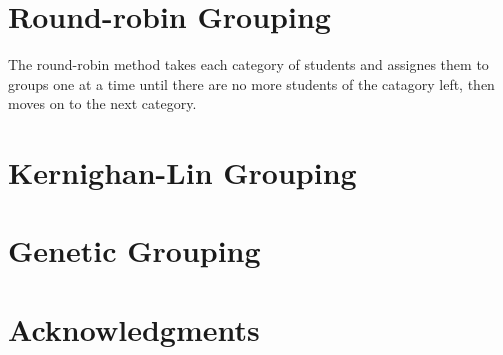\documentclass[a0paper,fleqn]{betterposter}
\begin{document}
{\section{Round-robin Grouping}
The round-robin method takes each category of students and assignes them to
groups one at a time until there are no more students of the catagory left, then
moves on to the next category.

\section{Kernighan-Lin Grouping}

\section{Genetic Grouping}

\section{Acknowledgments}

}
\end{document}
